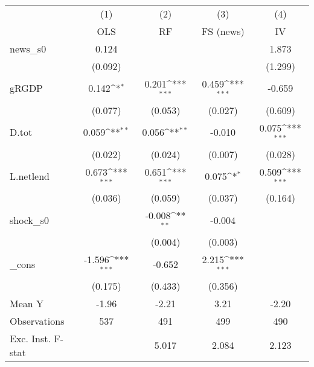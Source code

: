 {
\def\sym#1{\ifmmode^{#1}\else\(^{#1}\)\fi}
\begin{tabular}{l*{4}{c}}
\toprule
            &\multicolumn{1}{c}{(1)}&\multicolumn{1}{c}{(2)}&\multicolumn{1}{c}{(3)}&\multicolumn{1}{c}{(4)}\\
            &\multicolumn{1}{c}{OLS}&\multicolumn{1}{c}{RF}&\multicolumn{1}{c}{FS (news)}&\multicolumn{1}{c}{IV}\\
\midrule
news\_s0     &       0.124         &                     &                     &       1.873         \\
            &     (0.092)         &                     &                     &     (1.299)         \\
\addlinespace
gRGDP       &       0.142\sym{*}  &       0.201\sym{***}&       0.459\sym{***}&      -0.659         \\
            &     (0.077)         &     (0.053)         &     (0.027)         &     (0.609)         \\
\addlinespace
D.tot       &       0.059\sym{**} &       0.056\sym{**} &      -0.010         &       0.075\sym{***}\\
            &     (0.022)         &     (0.024)         &     (0.007)         &     (0.028)         \\
\addlinespace
L.netlend   &       0.673\sym{***}&       0.651\sym{***}&       0.075\sym{*}  &       0.509\sym{***}\\
            &     (0.036)         &     (0.059)         &     (0.037)         &     (0.164)         \\
\addlinespace
shock\_s0    &                     &      -0.008\sym{**} &      -0.004         &                     \\
            &                     &     (0.004)         &     (0.003)         &                     \\
\addlinespace
\_cons      &      -1.596\sym{***}&      -0.652         &       2.215\sym{***}&                     \\
            &     (0.175)         &     (0.433)         &     (0.356)         &                     \\
\midrule
Mean Y      &       -1.96         &       -2.21         &        3.21         &       -2.20         \\
Observations&         537         &         491         &         499         &         490         \\
Exc. Inst. F-stat&                     &       5.017         &       2.084         &       2.123         \\
\bottomrule
\end{tabular}
}
